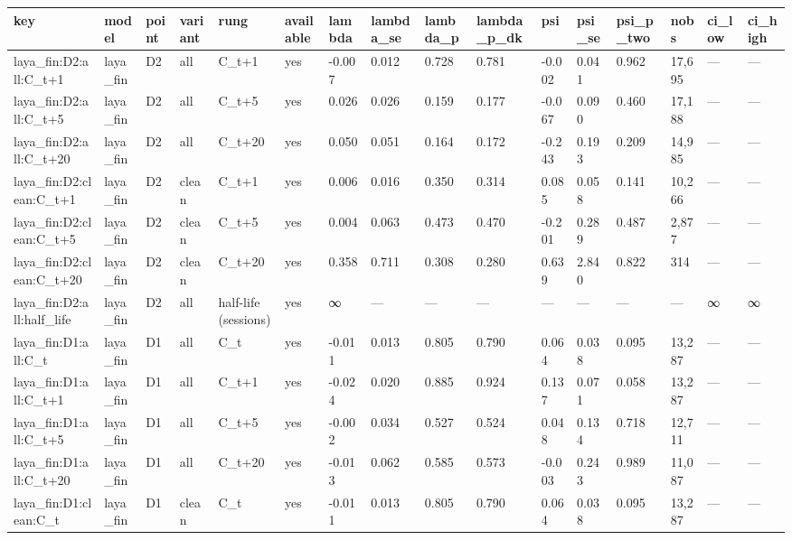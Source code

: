 \begin{tabular}{llllllllllllllll}
\toprule
key & model & point & variant & rung & available & lambda & lambda\_se & lambda\_p & lambda\_p\_dk & psi & psi\_se & psi\_p\_two & nobs & ci\_low & ci\_high \\
\midrule
laya\_fin:D2:all:C\_t+1 & laya\_fin & D2 & all & C\_t+1 & yes & -0.007 & 0.012 & 0.728 & 0.781 & -0.002 & 0.041 & 0.962 & 17,695 & — & — \\
laya\_fin:D2:all:C\_t+5 & laya\_fin & D2 & all & C\_t+5 & yes & 0.026 & 0.026 & 0.159 & 0.177 & -0.067 & 0.090 & 0.460 & 17,188 & — & — \\
laya\_fin:D2:all:C\_t+20 & laya\_fin & D2 & all & C\_t+20 & yes & 0.050 & 0.051 & 0.164 & 0.172 & -0.243 & 0.193 & 0.209 & 14,985 & — & — \\
laya\_fin:D2:clean:C\_t+1 & laya\_fin & D2 & clean & C\_t+1 & yes & 0.006 & 0.016 & 0.350 & 0.314 & 0.085 & 0.058 & 0.141 & 10,266 & — & — \\
laya\_fin:D2:clean:C\_t+5 & laya\_fin & D2 & clean & C\_t+5 & yes & 0.004 & 0.063 & 0.473 & 0.470 & -0.201 & 0.289 & 0.487 & 2,877 & — & — \\
laya\_fin:D2:clean:C\_t+20 & laya\_fin & D2 & clean & C\_t+20 & yes & 0.358 & 0.711 & 0.308 & 0.280 & 0.639 & 2.840 & 0.822 & 314 & — & — \\
laya\_fin:D2:all:half\_life & laya\_fin & D2 & all & half-life (sessions) & yes & ∞ & — & — & — & — & — & — & — & ∞ & ∞ \\
laya\_fin:D1:all:C\_t & laya\_fin & D1 & all & C\_t & yes & -0.011 & 0.013 & 0.805 & 0.790 & 0.064 & 0.038 & 0.095 & 13,287 & — & — \\
laya\_fin:D1:all:C\_t+1 & laya\_fin & D1 & all & C\_t+1 & yes & -0.024 & 0.020 & 0.885 & 0.924 & 0.137 & 0.071 & 0.058 & 13,287 & — & — \\
laya\_fin:D1:all:C\_t+5 & laya\_fin & D1 & all & C\_t+5 & yes & -0.002 & 0.034 & 0.527 & 0.524 & 0.048 & 0.134 & 0.718 & 12,711 & — & — \\
laya\_fin:D1:all:C\_t+20 & laya\_fin & D1 & all & C\_t+20 & yes & -0.013 & 0.062 & 0.585 & 0.573 & -0.003 & 0.243 & 0.989 & 11,087 & — & — \\
laya\_fin:D1:clean:C\_t & laya\_fin & D1 & clean & C\_t & yes & -0.011 & 0.013 & 0.805 & 0.790 & 0.064 & 0.038 & 0.095 & 13,287 & — & — \\

\end{tabular}
